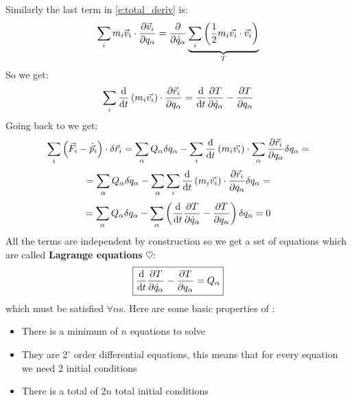 Similarly the last term in \eqref{e:total_deriv} is:
\begin{equation}
    \displaystyle\sum_im_i\vec{v}_i \cdot \dfrac{\partial \vec{v}_i}{\partial q_{\alpha}} = \dfrac{\partial }{\partial \dot{q}_{\alpha}} \underbrace{\displaystyle\sum_i \left(\dfrac{1}{2}m_i \vec{v_i} \cdot \vec{v_i}\right)}_{T}
\end{equation}
So we get:
\begin{equation}
    \displaystyle\sum_i \dfrac{\mathrm{d} }{\mathrm{d}t}\left(m_i\vec{v_i}\right)\cdot \dfrac{\partial \vec{r}_i}{\partial q_{\alpha}} = \dfrac{\mathrm{d} }{\mathrm{d}t}\dfrac{\partial T}{\partial \dot{q}_{\alpha}} - \dfrac{\partial T}{\partial q_{\alpha}}
\end{equation}
Going back to \dalambertref\;we get:
\begin{equation}
    \displaystyle\sum_i \left(\vec{F}_i - \dot{\vec{p}}_i\right) \cdot \delta \vec{r}_i = \displaystyle\sum_{\alpha}Q_{\alpha}\delta q_{\alpha} - \displaystyle\sum_i \dfrac{\mathrm{d} }{\mathrm{d}t}\left(m_i\vec{v_i}\right) \cdot \displaystyle\sum_{\alpha}\dfrac{\partial \vec{r}_i}{\partial q_{\alpha}}\delta q_{\alpha} =
\end{equation}
\begin{equation}
    = \displaystyle\sum_{\alpha}Q_{\alpha}\delta q_{\alpha} - \displaystyle\sum_{\alpha}\displaystyle\sum_i \dfrac{\mathrm{d} }{\mathrm{d}t}\left(m_i\vec{v_i}\right) \cdot \dfrac{\partial \vec{r}_i}{\partial q_{\alpha}}\delta q_{\alpha} =
\end{equation}
\begin{equation}
    = \displaystyle\sum_{\alpha}Q_{\alpha}\delta q_{\alpha} - \displaystyle\sum_{\alpha}\left(\dfrac{\mathrm{d} }{\mathrm{d}t}\dfrac{\partial T}{\partial \dot{q}_{\alpha}} - \dfrac{\partial T}{\partial q_{\alpha}}\right)\delta q_{\alpha} = 0
\end{equation}
All the terms are independent by construction so we get a set of equations which are called \textbf{Lagrange equations} $\heartsuit$:
\begin{equation} \label{Lagrange_equations}
    \boxed{\dfrac{\mathrm{d} }{\mathrm{d}t}\dfrac{\partial T}{\partial \dot{q}_{\alpha}} - \dfrac{\partial T}{\partial q_{\alpha}} = Q_{\alpha}}
\end{equation}
which must be satisfied $\forall \alpha$s.
Here are some basic properties of \lagrangeref :
\begin{itemize}
    \item There is a minimum of $n$ equations to solve
    \item They are $2^\circ$ order differential equations, this means that for every equation we need 2 initial conditions
    \item There is a total of $2n$ total initial conditions
\end{itemize}
